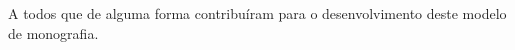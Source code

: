 \begin{agradecimentos}
	
	A todos que de alguma forma contribuíram para o desenvolvimento deste modelo de monografia.	
\end{agradecimentos}